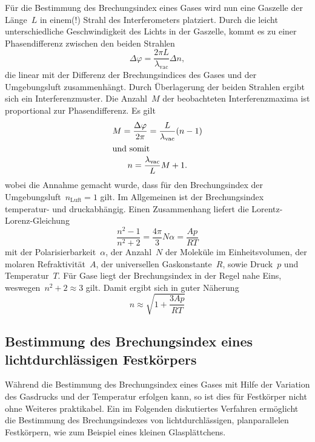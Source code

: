 Für die Bestimmung des Brechungsindex eines Gases wird nun eine Gaszelle der
Länge~$L$ in einem(!) Strahl des Interferometers platziert. Durch die leicht
unterschiedliche Geschwindigkeit des Lichts in der Gaszelle, kommt es zu einer
Phasendifferenz zwischen den beiden Strahlen
\begin{equation}
  \Delta\varphi=\frac{2\pi L}{\lambda_{\text{vac}}}\Delta n,
\end{equation}
die linear mit der Differenz der Brechungsindices des Gases und der
Umgebungsluft zusammenhängt. Durch Überlagerung der beiden Strahlen ergibt sich
ein Interferenzmuster. Die Anzahl~$M$ der beobachteten Interferenzmaxima ist
proportional zur Phasendifferenz. Es gilt
\begin{gather}
  M=\frac{\Delta\varphi}{2\pi}=\frac{L}{\lambda_{\text{vac}}}(n-1) \\
  \shortintertext{und somit}
  n=\frac{\lambda_{\text{vac}}}{L}M+1.
  \label{eq:brechungsindex_gas}
\end{gather}
wobei die Annahme gemacht wurde, dass für den Brechungsindex der
Umgebungsluft~$n_{\text{Luft}}=1$ gilt. Im Allgemeinen ist der Brechungsindex
temperatur- und druckabhängig. Einen Zusammenhang liefert die
Lorentz-Lorenz-Gleichung
\begin{equation}
  \frac{n^2-1}{n^2+2}=\frac{4\pi}{3}N\alpha=\frac{Ap}{RT}
\end{equation}
mit der Polarisierbarkeit~$\alpha$, der Anzahl~$N$ der Moleküle im
Einheitsvolumen, der molaren Refraktivität~$A$, der universellen
Gaskonstante~$R$, sowie Druck~$p$ und Temperatur~$T$. Für Gase liegt der
Brechungsindex in der Regel nahe Eins, weswegen~$n^2+2\approx3$ gilt. Damit
ergibt sich in guter Näherung
\begin{equation}
  n\approx\sqrt{1+\frac{3Ap}{RT}}
  \label{eq:näherung}
\end{equation}

\subsection{Bestimmung des Brechungsindex eines lichtdurchlässigen Festkörpers}
Während die Bestimmung des Brechungsindex eines Gases mit Hilfe der Variation
des Gasdrucks und der Temperatur erfolgen kann, so ist dies für Festkörper nicht
ohne Weiteres praktikabel. Ein im Folgenden diskutiertes Verfahren ermöglicht
die Bestimmung des Brechungsindexes von lichtdurchlässigen, planparallelen
Festkörpern, wie zum Beispiel eines kleinen Glasplättchens.

